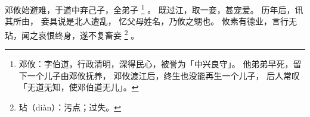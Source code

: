 
\switchcolumn*[\section{}]

邓攸始避难，于道中弃己子，全弟子%
\footnote{%
    邓攸：字伯道，行政清明，深得民心，被誉为「中兴良守」。
          他弟弟早死，留下一个儿子由邓攸抚养，
          邓攸渡江后，终生也没能再生一个儿子，
          后人常叹「无道无知，使邓伯道无儿」。
}%
。
既过江，取一妾，甚宠爱。
历年后，讯其所由，
妾具说是北人遭乱，
忆父母姓名，乃攸之甥也。
攸素有德业，言行无玷，闻之哀恨终身，遂不复畜妾%
\footnote{%
    玷（diàn）：污点；过失。
}%
。

\switchcolumn


